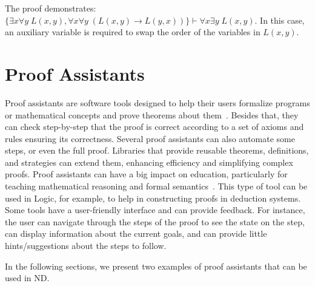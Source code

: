 The proof demonstrates: \(\{\exists x \forall y \; L(x,y), \forall x \forall y \;(L(x,y) \to L(y,x))\} \vdash \forall x \exists y \;L(x,y)\). In this case, an auxiliary variable is required to swap the order of the variables in \(L(x,y)\).   



\section{Proof Assistants}
\label{chap:assistants}
Proof assistants are software tools designed to help their users formalize programs or mathematical concepts and prove theorems about them~\cite{andersschlichtkrull_2015_formalization}. Besides that, they can check step-by-step that the proof is correct according to a set of axioms and rules ensuring its correctness. Several proof assistants can also automate some steps, or even the full proof. Libraries that provide reusable theorems, definitions, and strategies can extend them, enhancing efficiency and simplifying complex proofs. Proof assistants can have a big impact on education, particularly for teaching mathematical reasoning and formal semantics~\cite{evmorfiairobartzia_2023_proof}. This type of tool can be used in Logic, for example, to help in constructing proofs in deduction systems. Some tools have a user-friendly interface and can provide feedback. For instance, the user can navigate through the steps of the proof to see the state on the step, can display information about the current goals, and can provide little hints/suggestions about the steps to follow.

In the following sections, we present two examples of proof assistants that can be used in \gls{ND}.


